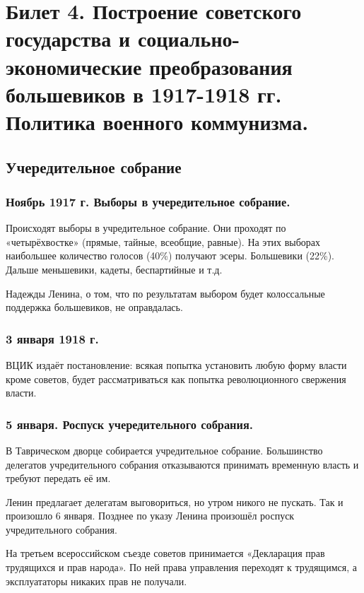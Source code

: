 \section{Билет 4. Построение советского государства и социально-экономические преобразования большевиков в 1917-1918 гг. Политика военного коммунизма.}

\subsection{Учередительное собрание}

\subsubsection{\textbf{Ноябрь 1917 г. Выборы в учередительное собрание.}}

 Происходят выборы в учредительное собрание. Они проходят по «четырёхвостке» (прямые, тайные, всеобщие, равные). На этих выборах наибольшее количество голосов (40\%) получают эсеры. Большевики (22\%). Дальше меньшевики, кадеты, беспартийные и т.д.
 
Надежды Ленина, о том, что по результатам выбором будет колоссальные поддержка большевиков, не оправдалась.

\subsubsection{\textbf{3 января 1918 г.}}

ВЦИК издаёт постановление: всякая попытка установить любую форму власти кроме советов, будет рассматриваться как попытка революционного свержения власти.

\subsubsection{\textbf{5 января. Роспуск учередительного собрания.}}

В Таврическом дворце собирается учредительное собрание. Большинство делегатов учредительного собрания отказываются принимать временную власть и требуют передать её им.

Ленин предлагает делегатам выговориться, но утром никого не пускать. Так и произошло 6 января. Позднее по указу Ленина произошёл роспуск учредительного собрания.

На третьем всероссийском съезде советов принимается «Декларация прав трудящихся и прав народа». По ней права управления переходят к трудящимся, а эксплуататоры никаких прав не получали.

